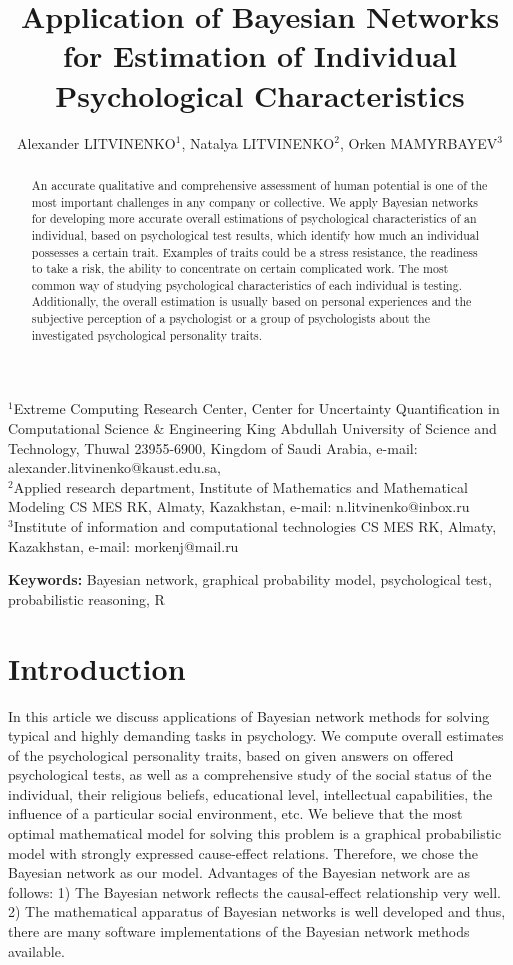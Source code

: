 \documentclass[12pt]{article}
\title{Application of Bayesian Networks for Estimation of Individual Psychological Characteristics}
\author{Alexander LITVINENKO$^1$, Natalya LITVINENKO$^2$, Orken MAMYRBAYEV$^3$}
\begin{document}
\maketitle
\begin{center}
$^1$Extreme Computing Research Center, Center for Uncertainty Quantification in Computational Science \& Engineering King Abdullah University of Science and Technology, Thuwal 23955-6900, Kingdom of Saudi Arabia, e-mail: alexander.litvinenko@kaust.edu.sa,\\
$^2$Applied research department, Institute of Mathematics and Mathematical Modeling CS MES RK, Almaty, Kazakhstan, e-mail: n.litvinenko@inbox.ru\\
$^3$Institute of information and computational technologies CS MES RK, Almaty, Kazakhstan,
e-mail: morkenj@mail.ru
\end{center}

\begin{abstract}
An accurate qualitative and comprehensive assessment of human potential is one of the most important challenges in any company or collective. We apply Bayesian networks for developing more accurate overall estimations of psychological characteristics of an individual, based on psychological test results, which identify how much an individual possesses a certain trait. Examples of traits could be a stress resistance, the readiness to take a risk, the ability to concentrate on certain complicated work. The most common way of studying psychological characteristics of each individual is testing. Additionally, the overall estimation is usually based on personal experiences and the subjective perception of a psychologist or a group of psychologists about the investigated psychological personality traits.
 
\end{abstract}
\textbf{Keywords:} Bayesian network, graphical probability model, psychological test, probabilistic reasoning, R


\section{Introduction}
In this article we discuss applications of Bayesian network methods for solving typical and highly demanding tasks in psychology. 
We compute overall estimates of the psychological personality traits, based on given answers on offered psychological tests, as well as a comprehensive study of the social status of the individual, their religious beliefs, educational level, intellectual capabilities, the influence of a particular social environment, etc.
We believe that the most optimal mathematical model for solving this problem is a graphical probabilistic model with strongly expressed cause-effect relations. Therefore, we chose the Bayesian network as our model. Advantages of the Bayesian network are as follows: 1) The Bayesian network reflects the causal-effect relationship very well. 2) The mathematical apparatus of Bayesian networks is well developed and thus, there are many software implementations of the Bayesian network methods available.
\end{document}
